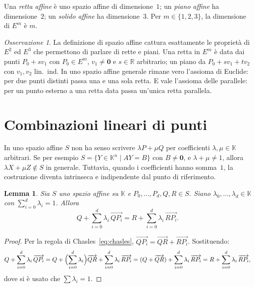 \documentclass[11pt, a4paper]{book}
\theoremstyle{definition}
\theoremstyle{plain}
\newtheorem{lemma}[definizione]{Lemma}
\theoremstyle{remark}
\newtheorem{osservazione}[definizione]{Osservazione}
\newcommand{\R}{\mathbb{R}}
\newcommand{\K}{\mathbb{K}}
\begin{document}
Una \emph{retta affine} è uno spazio affine di dimensione~$1$; un \emph{piano affine} ha dimensione~$2$; un \emph{solido affine} ha dimensione~$3$. Per $m \in \{1,2,3\}$, la dimensione di $E^m$ è $m$.

\begin{osservazione}
La definizione di spazio affine cattura esattamente le proprietà di $E^2$ ed $E^3$ che permettono di parlare di rette e piani. Una retta in $E^m$ è data dai punti $P_0 + sv_1$ con $P_0 \in E^m$, $v_1 \neq \mathbf{0}$ e $s \in \R$ arbitrario; un piano da $P_0 + sv_1 + tv_2$ con $v_1, v_2$ lin.\ ind. In uno spazio affine generale rimane vero l'assioma di Euclide: per due punti distinti passa una e una sola retta. E vale l'assioma delle parallele: per un punto esterno a una retta data passa un'unica retta parallela.
\end{osservazione}

\section{Combinazioni lineari di punti}
\label{sec:comb-lin-punti}

In uno spazio affine $S$ non ha senso scrivere $\lambda P + \mu Q$ per coefficienti $\lambda, \mu \in \K$ arbitrari. Se per esempio $S = \{Y \in \K^n \mid AY = B\}$ con $B \neq \mathbf{0}$, e $\lambda + \mu \neq 1$, allora $\lambda X + \mu Z \notin S$ in generale. Tuttavia, quando i coefficienti hanno somma~$1$, la costruzione diventa intrinseca e indipendente dal punto di riferimento.

\begin{lemma}
\label{lem:comb-affine-ben-def}
Sia $S$ uno spazio affine su $\K$ e $P_0, \ldots, P_d, Q, R \in S$. Siano $\lambda_0, \ldots, \lambda_d \in \K$ con $\sum_{i=0}^d \lambda_i = 1$. Allora
\[
  Q + \sum_{i=0}^d \lambda_i \,\overrightarrow{QP_i} = R + \sum_{i=0}^d \lambda_i \,\overrightarrow{RP_i}.
\]
\end{lemma}

\begin{proof}
Per la regola di Chasles~\eqref{eq:chasles}, $\overrightarrow{QP_i} = \overrightarrow{QR} + \overrightarrow{RP_i}$. Sostituendo:
\[
  Q + \sum_{i=0}^d \lambda_i \,\overrightarrow{QP_i} = Q + \Bigl(\sum_{i=0}^d \lambda_i\Bigr)\overrightarrow{QR} + \sum_{i=0}^d \lambda_i \,\overrightarrow{RP_i} = (Q + \overrightarrow{QR}) + \sum_{i=0}^d \lambda_i \,\overrightarrow{RP_i} = R + \sum_{i=0}^d \lambda_i \,\overrightarrow{RP_i},
\]
dove si è usato che $\sum \lambda_i = 1$.
\end{proof}
\end{document}
